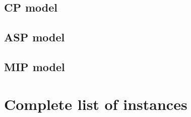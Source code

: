 \newpage


\newpage

\newpage



\subsection{CP model}\label{appendix:CP}
\vspace{-0.6cm}

\subsection{ASP model}\label{appendix:ASP}

%
\subsection{MIP model}\label{appendix:MIP}

\section{Complete list of instances}\label{appendix:instances}
